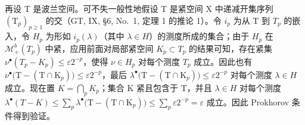 再设 T 是波兰空间。可不失一般性地假设 T 是紧空间 X 中递减开集序列 \((\mathrm{T}_{p})_{p\geqslant1}\) 的交（GT, IX, §6, No.~1, 定理 1 的推论 1）。令 \(i_{p}\) 为从 T 到 \(T_{p}\) 的嵌入，令 \(H_{p}\) 为形如 \(i_{p}(\lambda)\)（其中 \(\lambda\in H\)）的测度所成的集合；由于 \(H_{p}\) 在 \(\mathcal{M}_{+}^{b}(T_{p})\) 中紧，应用前面对局部紧空间 \(K_{p}\subset T_{p}\) 的结果可知，存在紧集 \(\nu^{\bullet}(T_{p}-K_{p})\leqslant\varepsilon2^{-p}\)，使得 \(\nu\in H_{p}\) 对每个测度 \(T_{p}\) 成立。因此也有 \(\nu^{\bullet}\big(\mathrm{T}-(\mathrm{T}\cap\mathrm{K}_{p})\big)\leqslant\varepsilon2^{-p}\)，最后 \(\lambda^{\bullet}\big(\mathrm{T}-(\mathrm{T}\cap\mathrm{K}_{p})\big)\leqslant\varepsilon2^{-p}\) 对每个测度 \(\lambda\in H\) 成立。现在置 \(K=\bigcap_{p}K_{p}\)；集合 K 紧且包含于 T，并且 \(\lambda\in H\) 对每个测度 \(\lambda^{\bullet}(T-K)\leqslant\sum_{p}\lambda^{\bullet}\big(\mathrm{T}-(\mathrm{T}\cap\mathrm{K}_{p})\big)\leqslant\sum_{p}\varepsilon2^{-p}=\varepsilon\) 成立。因此 Prokhorov 条件得到验证。

